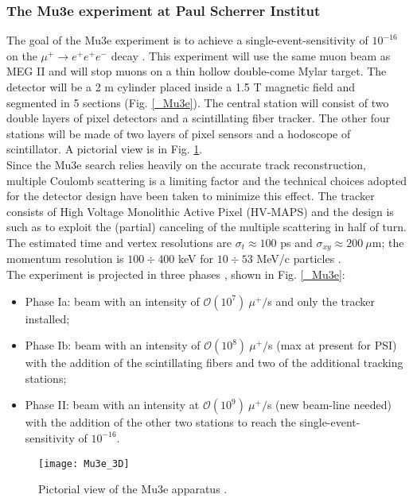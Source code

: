 \documentclass[12pt,a4paper,openright, oneside, titlepage]{book} %
\begin{document}
\subsubsection{The Mu3e experiment at Paul Scherrer Institut}
The goal of the Mu3e experiment is to achieve a single-event-sensitivity of  $10^{-16}$
on the $\mu^+ \rightarrow e^+ e^+e^-$ decay \cite{Mu3e:2016}.  
This experiment will use the same muon beam as MEG II and will stop muons on a thin hollow double-come Mylar target. 
The detector will be a 2 m cylinder placed inside a 1.5 T magnetic field and segmented in 5 sections (Fig. \ref{_Mu3e}). 
The central station will consist of two double layers of pixel detectors and a scintillating fiber tracker. 
The other four stations will be made of two layers of pixel sensors and a hodoscope of scintillator. A pictorial view is in Fig. \ref{_Mu3e_3D}.\\
Since the Mu3e search relies heavily on the accurate track reconstruction, 
multiple Coulomb scattering is a limiting factor and the technical choices adopted for the detector design
have been taken to minimize this effect. 
The tracker consists of High Voltage Monolithic Active Pixel (HV-MAPS) 
and the design is such as to exploit the (partial) canceling of the multiple scattering in half of turn. 
The estimated time and vertex resolutions are $\sigma_t\approx 100$ ps  and $\sigma_{xy}\approx 200\ \mu$m; 
the momentum resolution is $100\div400$ keV for $10\div53$ MeV/c particles \cite{signorelli}.\\
The experiment is projected in three phases  \cite{signorelli}, shown in Fig. \ref{_Mu3e}:
\begin{itemize}
\item Phase Ia: beam with an intensity of $\mathcal{O}(10^7)\ \mu^+/$s and only the tracker installed;
\item Phase Ib: beam with an intensity of $\mathcal{O}(10^8)\ \mu^+/$s (max at present for PSI) 
with the addition of the scintillating fibers and two of the additional tracking stations;
\item Phase II: beam with an intensity at $\mathcal{O}(10^9)\ \mu^+/$s (new beam-line needed) 
with the addition of the other two stations to reach the single-event-sensitivity of $10^{-16}$.
\end{itemize}

\begin{figure}[h!]
\centering
\texttt{[image: Mu3e\_3D]}
\caption{Pictorial view of the Mu3e apparatus \cite{Papa}.}
\label{_Mu3e_3D}
\end{figure}
\end{document}

